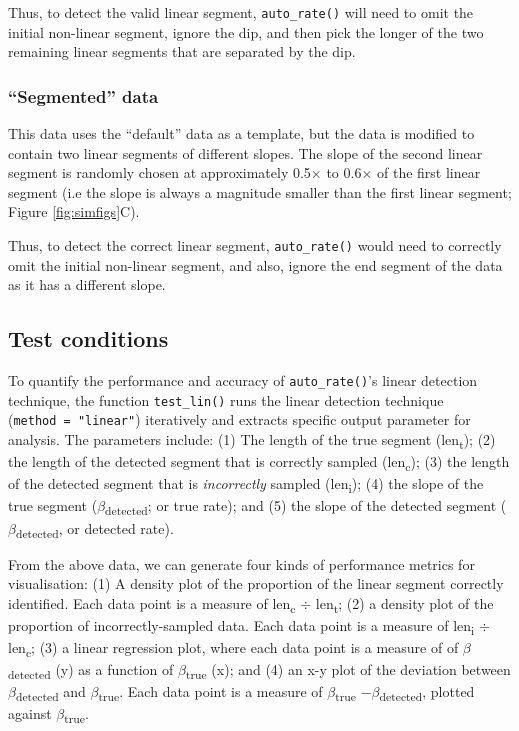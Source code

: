 \documentclass[a4paper,10pt, oneside]{memoir}
\begin{document}
Thus, to detect the valid linear segment, \texttt{auto\_rate()} will need to omit the initial non-linear segment, ignore the dip, and then pick the longer of the two remaining linear segments that are separated by the dip.

\hypertarget{segmented-data}{%
\subsubsection{``Segmented'' data}\label{segmented-data}}

This data uses the ``default'' data as a template, but the data is modified to contain two linear segments of different slopes.
The slope of the second linear segment is randomly chosen at approximately 0.5\(\times\) to 0.6\(\times\) of the first linear segment (i.e the slope is always a magnitude smaller than the first linear segment; Figure \ref{fig:simfigs}C).

Thus, to detect the correct linear segment, \texttt{auto\_rate()} would need to correctly omit the initial non-linear segment, and also, ignore the end segment of the data as it has a different slope.

\hypertarget{test-conditions}{%
\subsection{Test conditions}\label{test-conditions}}

To quantify the performance and accuracy of \texttt{auto\_rate()}'s linear detection technique, the function \texttt{test\_lin()} runs the linear detection technique (\texttt{method\ =\ "linear"}) iteratively and extracts specific output parameter for analysis.
The parameters include: (1) The length of the true segment (len\textsubscript{t}); (2) the length of the detected segment that is correctly sampled (len\textsubscript{c}); (3) the length of the detected segment that is \emph{incorrectly} sampled (len\textsubscript{i}); (4) the slope of the true segment (\(\beta\)\textsubscript{detected}; or true rate); and (5) the slope of the detected segment (\(\beta\)\textsubscript{detected}, or detected rate).

From the above data, we can generate four kinds of performance metrics for visualisation: (1) A density plot of the proportion of the linear segment correctly identified. Each data point is a measure of len\textsubscript{c} \(\div\) len\textsubscript{t}; (2) a density plot of the proportion of incorrectly-sampled data. Each data point is a measure of len\textsubscript{i} \(\div\) len\textsubscript{c}; (3) a linear regression plot, where each data point is a measure of of \(\beta\)\textsubscript{detected} (y) as a function of \(\beta\)\textsubscript{true} (x); and (4) an x-y plot of the deviation between \(\beta\)\textsubscript{detected} and \(\beta\)\textsubscript{true}. Each data point is a measure of \(\beta\)\textsubscript{true} \(-\beta\)\textsubscript{detected}, plotted against \(\beta\)\textsubscript{true}.
\end{document}
